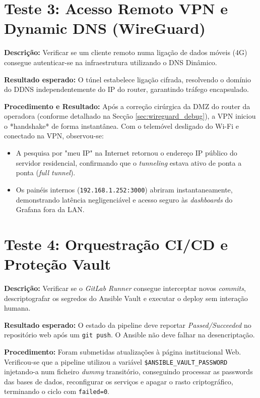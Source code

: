 \section{Teste 3: Acesso Remoto VPN e Dynamic DNS (WireGuard)}

\textbf{Descrição:} Verificar se um cliente remoto numa ligação de dados móveis (4G) consegue autenticar-se na infraestrutura utilizando o DNS Dinâmico.

\textbf{Resultado esperado:} O túnel estabelece ligação cifrada, resolvendo o domínio do DDNS independentemente do IP do router, garantindo tráfego encapsulado.

\textbf{Procedimento e Resultado:} Após a correção cirúrgica da DMZ do router da operadora (conforme detalhado na Secção \ref{sec:wireguard_debug}), a VPN iniciou o *handshake* de forma instantânea. 
Com o telemóvel desligado do Wi-Fi e conectado na VPN, observou-se:
\begin{itemize}
    \item A pesquisa por "meu IP" na Internet retornou o endereço IP público do servidor residencial, confirmando que o \textit{tunneling} estava ativo de ponta a ponta (\textit{full tunnel}).
    \item Os painéis internos (\texttt{192.168.1.252:3000}) abriram instantaneamente, demonstrando latência negligenciável e acesso seguro às \textit{dashboards} do Grafana fora da LAN.
\end{itemize}

\section{Teste 4: Orquestração CI/CD e Proteção Vault}

\textbf{Descrição:} Verificar se o \textit{GitLab Runner} consegue interceptar novos \textit{commits}, descriptografar os segredos do Ansible Vault e executar o deploy sem interação humana.

\textbf{Resultado esperado:} O estado da pipeline deve reportar \textit{Passed/Succeeded} no repositório web após um \texttt{git push}. O Ansible não deve falhar na desencriptação.

\textbf{Procedimento:} Foram submetidas atualizações à página institucional Web. Verificou-se que a pipeline utilizou a variável \texttt{\$ANSIBLE\_VAULT\_PASSWORD} injetando-a num ficheiro \textit{dummy} transitório, conseguindo processar as passwords das bases de dados, reconfigurar os serviços e apagar o rasto criptográfico, terminando o ciclo com \texttt{failed=0}.

